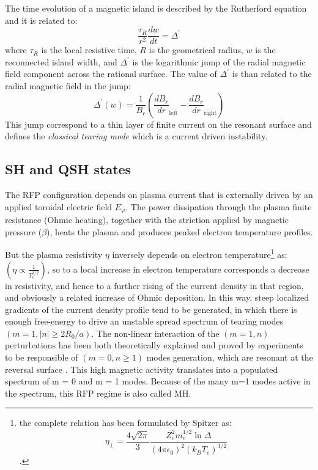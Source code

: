The time evolution of a magnetic island is described by the Rutherford equation and it is related to:
\begin{equation}
    \frac{\tau_R}{r^2} \frac{dw}{dt} = \Delta^\prime
\end{equation}
%
where $\tau_R$ is the local resistive time, $R$ is the geometrical radius, $w$ is the reconnected island width, and $\Delta^\prime$ is the logarithmic jump of the radial magnetic field component across the rational surface.
%
The value of $\Delta^\prime$ is than related to the radial magnetic field in the jump:
\begin{equation}
    \Delta^\prime (w) = \frac{1}{B_r} \left( \frac{dB_r}{dr}_\text{left} - \frac{dB_r}{dr}_\text{right} \right)
\end{equation}
%	
This jump correspond to a thin layer of finite current on the resonant surface and defines the \emph{classical tearing mode} which is a current driven instability.

\subsection{SH and QSH states}

The RFP configuration depends on plasma current that is externally driven by an applied toroidal electric field $E_\varphi$. 
The power dissipation through the plasma finite resistance (Ohmic heating), together with the striction applied by magnetic pressure ($\beta$), heats the plasma and produces peaked electron temperature profiles. 

But the plasma resistivity $\eta$ inversely depends on electron temperature\footnote{the complete relation has been formulated by Spitzer as: $$\eta_\bot  = \frac{4\sqrt{2\pi}}{3} \frac{Z_e^2 m_e^{1/2} \ln{\Delta}}{(4\pi\epsilon_0)^2(k_B T_e)^{3/2}} $$.}
as: $(\eta \propto \frac{1}{T_e^{3/2}})$, so to a local increase in electron temperature corresponds a decrease in resistivity, and hence to a further rising of the current density in that region, and obviously a related increase of Ohmic deposition. In this way, steep localized gradients of the current density profile tend to be generated, in which there is enough free-energy to drive an unstable spread spectrum of tearing modes $(m = 1, |n| \geq 2R_0 /a)$. The non-linear interaction of the $(m = 1, n)$ perturbations has been both theoretically explained and proved by experiments to be responsible of $(m = 0, n \geq 1)$ modes generation, which are resonant at the reversal surface \cite{Bonomo33}. This high magnetic activity translates into a populated spectrum of m = 0 and m = 1 modes.
Because of the many m=1 modes active in the spectrum, this RFP regime is also called \acl{MH}.

